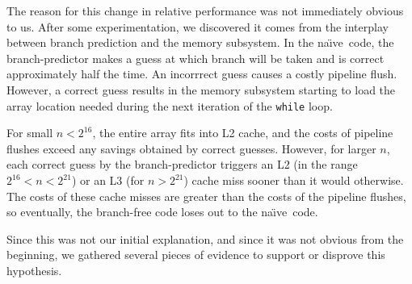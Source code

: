 \documentclass{patmorin}
\newcommand{\naive}{na\"{\i}ve}
\begin{document}
The reason for this change in relative performance was not immediately
obvious to us.  After some experimentation, we discovered it comes from
the interplay between branch prediction and the memory subsystem.  In the
\naive\ code, the branch-predictor makes a guess at which branch will
be taken and is correct approximately half the time. An incorrrect guess
causes a costly pipeline flush.  However, a correct guess results in
the memory subsystem starting to load the array location needed during
the next iteration of the \texttt{while} loop.

For small $n<2^{16}$, the entire array fits into L2 cache, and the costs
of pipeline flushes exceed any savings obtained by correct guesses.
However, for larger $n$, each correct guess by the branch-predictor
triggers an L2 (in the range $2^{16}<n<2^{21}$) or an L3 (for $n>2^{21}$)
cache miss sooner than it would otherwise.  The costs of these cache
misses are greater than the costs of the pipeline flushes, so eventually,
the branch-free code loses out to the \naive\ code.

Since this was not our initial explanation, and since it was not obvious
from the beginning, we gathered several pieces of evidence to support
or disprove this hypothesis.
\end{document}
